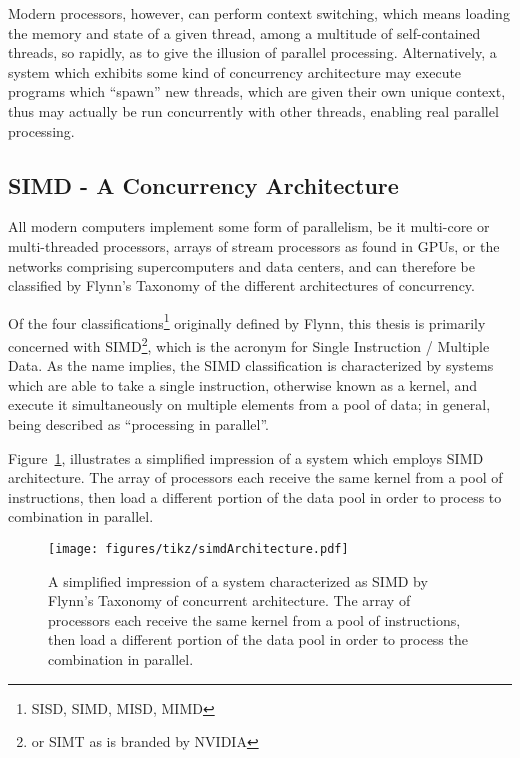 Modern processors, however, can perform context switching, which means loading the memory and state of a given thread, among a multitude of self-contained threads, so rapidly, as to give the illusion of parallel processing. Alternatively, a system which exhibits some kind of concurrency architecture may execute programs which ``spawn'' new threads, which are given their own unique context, thus may actually be run concurrently with other threads, enabling real parallel processing.

%
%
%
%
\subsection{SIMD - A Concurrency Architecture}
All modern computers implement some form of parallelism, be it multi-core or multi-threaded processors, arrays of stream processors as found in GPUs, or the networks comprising supercomputers and data centers, and can therefore be classified by Flynn's Taxonomy of the different architectures of concurrency.

Of the four classifications\footnote{SISD, SIMD, MISD, MIMD} originally defined by Flynn, this thesis is primarily concerned with SIMD\footnote{or SIMT as is branded by NVIDIA}, which is the acronym for Single Instruction / Multiple Data. As the name implies, the SIMD classification is characterized by systems which are able to take a single instruction, otherwise known as a kernel, and execute it simultaneously on multiple elements from a pool of data; in general, being described as ``processing in parallel''.

Figure~\ref{fig:simdArchitecture}, illustrates a simplified impression of a system which employs SIMD architecture. The array of processors each receive the same kernel from a pool of instructions, then load a different portion of the data pool in order to process to combination in parallel.

\begin{figure}[ht]
\ffigbox
	{\texttt{[image: figures/tikz/simdArchitecture.pdf]}}
	{\caption[SIMD Architecture]{A simplified impression of a system characterized as SIMD by Flynn's Taxonomy of concurrent architecture. The array of processors each receive the same kernel from a pool of instructions, then load a different portion of the data pool in order to process the combination in parallel.}\label{fig:simdArchitecture}}
\end{figure}

